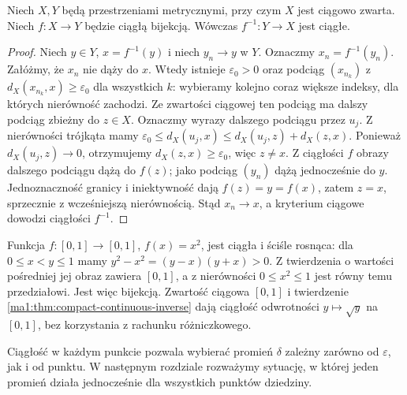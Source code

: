 \begin{twierdzenie}
\label{ma1:thm:compact-continuous-inverse}
Niech $X,Y$ będą przestrzeniami metrycznymi, przy czym $X$ jest ciągowo zwarta. Niech $f:X\to Y$ będzie ciągłą bijekcją. Wówczas $f^{-1}:Y\to X$ jest ciągłe.
\end{twierdzenie}
\begin{proof}
Niech $y\in Y$, $x=f^{-1}(y)$ i niech $y_n\to y$ w $Y$. Oznaczmy $x_n=f^{-1}(y_n)$. Załóżmy, że $x_n$ nie dąży do $x$. Wtedy istnieje $\varepsilon_0>0$ oraz podciąg $(x_{n_k})$ z $d_X(x_{n_k},x)\ge\varepsilon_0$ dla wszystkich $k$: wybieramy kolejno coraz większe indeksy, dla których nierówność zachodzi. Ze zwartości ciągowej ten podciąg ma dalszy podciąg zbieżny do $z\in X$. Oznaczmy wyrazy dalszego podciągu przez $u_j$. Z nierówności trójkąta mamy $\varepsilon_0\le d_X(u_j,x)\le d_X(u_j,z)+d_X(z,x)$. Ponieważ $d_X(u_j,z)\to0$, otrzymujemy $d_X(z,x)\ge\varepsilon_0$, więc $z\ne x$. Z ciągłości $f$ obrazy dalszego podciągu dążą do $f(z)$; jako podciąg $(y_n)$ dążą jednocześnie do $y$. Jednoznaczność granicy i iniektywność dają $f(z)=y=f(x)$, zatem $z=x$, sprzecznie z wcześniejszą nierównością. Stąd $x_n\to x$, a kryterium ciągowe dowodzi ciągłości $f^{-1}$.
\end{proof}
\begin{przyklad}
\label{ma1:ex:square-inverse-continuous}
Funkcja $f:[0,1]\to[0,1]$, $f(x)=x^2$, jest ciągła i ściśle rosnąca: dla $0\le x<y\le1$ mamy $y^2-x^2=(y-x)(y+x)>0$. Z twierdzenia o wartości pośredniej jej obraz zawiera $[0,1]$, a z nierówności $0\le x^2\le1$ jest równy temu przedziałowi. Jest więc bijekcją. Zwartość ciągowa $[0,1]$ i twierdzenie \ref{ma1:thm:compact-continuous-inverse} dają ciągłość odwrotności $y\mapsto\sqrt y$ na $[0,1]$, bez korzystania z rachunku różniczkowego.
\end{przyklad}

Ciągłość w każdym punkcie pozwala wybierać promień $\delta$ zależny zarówno od $\varepsilon$, jak i od punktu. W następnym rozdziale rozważymy sytuację, w której jeden promień działa jednocześnie dla wszystkich punktów dziedziny.
